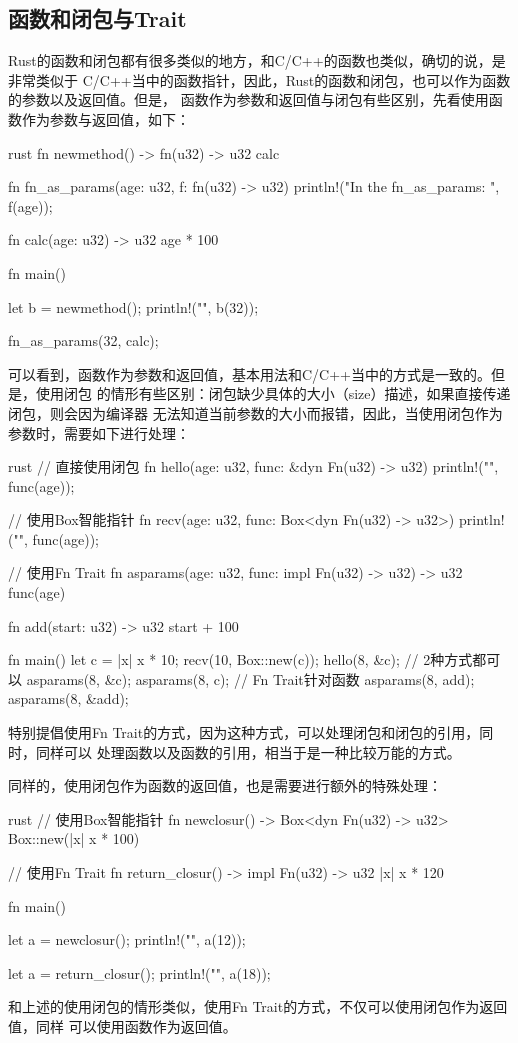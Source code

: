 \subsection{函数和闭包与Trait}
Rust的函数和闭包都有很多类似的地方，和C/C++的函数也类似，确切的说，是非常类似于
C/C++当中的函数指针，因此，Rust的函数和闭包，也可以作为函数的参数以及返回值。但是，
函数作为参数和返回值与闭包有些区别，先看使用函数作为参数与返回值，如下：
\begin{code-block}{rust}
fn newmethod() -> fn(u32) -> u32 {
    calc
}

fn fn_as_params(age: u32, f: fn(u32) -> u32) {
    println!("In the fn_as_params: {}", f(age));
}

fn calc(age: u32) -> u32 {
    age * 100
}

fn main() {
    let b = newmethod();
    println!("{}", b(32));

    fn_as_params(32, calc);
}
\end{code-block}
可以看到，函数作为参数和返回值，基本用法和C/C++当中的方式是一致的。但是，使用闭包
的情形有些区别：闭包缺少具体的大小（size）描述，如果直接传递闭包，则会因为编译器
无法知道当前参数的大小而报错，因此，当使用闭包作为参数时，需要如下进行处理：
\begin{code-block}{rust}
// 直接使用闭包
fn hello(age: u32, func: &dyn Fn(u32) -> u32) {
    println!("{}", func(age));
}

// 使用Box智能指针
fn recv(age: u32, func: Box<dyn Fn(u32) -> u32>) {
    println!("{}", func(age));
}

// 使用Fn Trait
fn asparams(age: u32, func: impl Fn(u32) -> u32) -> u32{
    func(age)
}

fn add(start: u32) -> u32 {
    start + 100
}

fn main() {
    let c = |x| x * 10;
    recv(10, Box::new(c));
    hello(8, &c);
    // 2种方式都可以
    asparams(8, &c);
    asparams(8, c);
    // Fn Trait针对函数
    asparams(8, add);
    asparams(8, &add);
}
\end{code-block}
特别提倡使用Fn Trait的方式，因为这种方式，可以处理闭包和闭包的引用，同时，同样可以
处理函数以及函数的引用，相当于是一种比较万能的方式。

同样的，使用闭包作为函数的返回值，也是需要进行额外的特殊处理：
\begin{code-block}{rust}
// 使用Box智能指针
fn newclosur() -> Box<dyn Fn(u32) -> u32> {
    Box::new(|x| x * 100)
}

// 使用Fn Trait
fn return_closur() -> impl Fn(u32) -> u32 {
    |x| x * 120
}

fn main() {
    let a = newclosur();
    println!("{}", a(12));

    let a = return_closur();
    println!("{}", a(18));
}
\end{code-block}
和上述的使用闭包的情形类似，使用Fn Trait的方式，不仅可以使用闭包作为返回值，同样
可以使用函数作为返回值。

